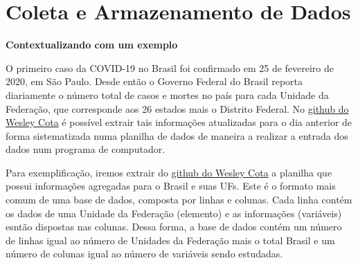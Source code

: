\documentclass[
]{book}
\begin{document}
\hypertarget{coleta-e-armazenamento-de-dados}{%
\section{Coleta e Armazenamento de Dados}\label{coleta-e-armazenamento-de-dados}}

\textbf{Contextualizando com um exemplo}

O primeiro caso da COVID-19 no Brasil foi confirmado em 25 de fevereiro de 2020, em São Paulo. Desde então o Governo Federal do Brasil reporta diariamente o número total de casos e mortes no país para cada Unidade da Federação, que corresponde aos 26 estados mais o Distrito Federal. No \href{https://github.com/wcota/covid19br}{github do Wesley Cota} \citep{CotaCovid19br2020} é possível extrair tais informações atualizadas para o dia anterior de forma sistematizada numa planilha de dados de maneira a realizar a entrada dos dados num programa de computador.

Para exemplificação, iremos extrair do \href{https://github.com/wcota/covid19br}{github do Wesley Cota} a planilha que possui informações agregadas para o Brasil e suas UFs. Este é o formato mais comum de uma base de dados, composta por linhas e colunas. Cada linha contém os dados de uma Unidade da Federação (elemento) e as informações (variáveis) esntão dispostas nas colunas. Dessa forma, a base de dados contém um número de linhas igual ao número de Unidades da Federação mais o total Brasil e um número de colunas igual ao número de variáveis sendo estudadas.
\end{document}
